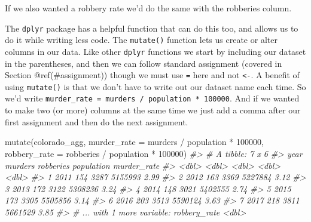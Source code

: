\documentclass[
]{krantz}
\makeatletter
\newenvironment{Shaded}{\begin{snugshade}}{\end{snugshade}}
\newcommand{\AttributeTok}[1]{\textcolor[rgb]{0.61,0.61,0.61}{#1}}
\newcommand{\CommentTok}[1]{\textcolor[rgb]{0.37,0.37,0.37}{\textit{#1}}}
\newcommand{\DecValTok}[1]{\textcolor[rgb]{0.06,0.06,0.06}{#1}}
\newcommand{\FunctionTok}[1]{\textcolor[rgb]{0,0,0}{#1}}
\newcommand{\NormalTok}[1]{#1}
\newcommand{\OtherTok}[1]{\textcolor[rgb]{0.37,0.37,0.37}{#1}}
\newcommand{\SpecialCharTok}[1]{\textcolor[rgb]{0,0,0}{#1}}
\newenvironment{kframe}{%
\medskip{}
\setlength{\fboxsep}{.8em}
 \def\at@end@of@kframe{}%
 \ifinner\ifhmode%
  \def\at@end@of@kframe{\end{minipage}}%
  \begin{minipage}{\columnwidth}%
 \fi\fi%
 \def\FrameCommand##1{\hskip\@totalleftmargin \hskip-\fboxsep
 \colorbox{shadecolor}{##1}\hskip-\fboxsep
     \hskip-\linewidth \hskip-\@totalleftmargin \hskip\columnwidth}%
 \MakeFramed {\advance\hsize-\width
   \@totalleftmargin\z@ \linewidth\hsize
   \@setminipage}}%
 {\par\unskip\endMakeFramed%
 \at@end@of@kframe}
\renewenvironment{Shaded}{\begin{kframe}}{\end{kframe}}
\makeatother
\begin{document}
If we also wanted a robbery rate we'd do the same with the robberies column.

\begin{Shaded}
\end{Shaded}

The \texttt{dplyr} package has a helpful function that can do this too, and allows us to do it while writing less code. The \texttt{mutate()} function lets us create or alter columns in our data. Like other \texttt{dplyr} functions we start by including our dataset in the parentheses, and then we can follow standard assignment (covered in Section @ref(\#assignment)) though we must use \texttt{=} here and not \texttt{\textless{}-}. A benefit of using \texttt{mutate()} is that we don't have to write out our dataset name each time. So we'd write \texttt{murder\_rate\ =\ murders\ /\ population\ *\ 100000}. And if we wanted to make two (or more) columns at the same time we just add a comma after our first assignment and then do the next assignment.

\begin{Shaded}
\begin{Highlighting}[]
\FunctionTok{mutate}\NormalTok{(colorado\_agg, }\AttributeTok{murder\_rate =}\NormalTok{ murders }\SpecialCharTok{/}\NormalTok{ population }\SpecialCharTok{*} \DecValTok{100000}\NormalTok{, }\AttributeTok{robbery\_rate =}\NormalTok{ robberies }\SpecialCharTok{/}\NormalTok{ population }\SpecialCharTok{*} \DecValTok{100000}\NormalTok{)}
\CommentTok{\#\textgreater{} \# A tibble: 7 x 6}
\CommentTok{\#\textgreater{}    year murders robberies population murder\_rate}
\CommentTok{\#\textgreater{}   \textless{}dbl\textgreater{}   \textless{}dbl\textgreater{}     \textless{}dbl\textgreater{}      \textless{}dbl\textgreater{}       \textless{}dbl\textgreater{}}
\CommentTok{\#\textgreater{} 1  2011     154      3287    5155993        2.99}
\CommentTok{\#\textgreater{} 2  2012     163      3369    5227884        3.12}
\CommentTok{\#\textgreater{} 3  2013     172      3122    5308236        3.24}
\CommentTok{\#\textgreater{} 4  2014     148      3021    5402555        2.74}
\CommentTok{\#\textgreater{} 5  2015     173      3305    5505856        3.14}
\CommentTok{\#\textgreater{} 6  2016     203      3513    5590124        3.63}
\CommentTok{\#\textgreater{} 7  2017     218      3811    5661529        3.85}
\CommentTok{\#\textgreater{} \# ... with 1 more variable: robbery\_rate \textless{}dbl\textgreater{}}
\end{Highlighting}
\end{Shaded}
\end{document}
